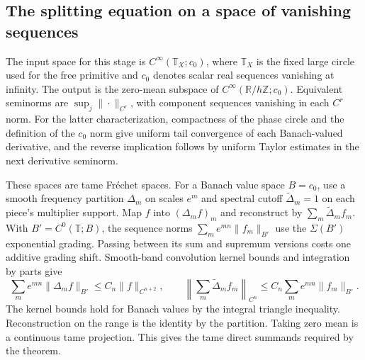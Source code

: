 \documentclass[11pt]{article}
\begin{document}
\subsection{The splitting equation on a space of vanishing
sequences}\label{the-splitting-equation-on-a-space-of-vanishing-sequences}

The input space for this stage is \(C^\infty(\mathbb T_X;c_0)\), where
\(\mathbb T_X\) is the fixed large circle used for the free primitive and
\(c_0\) denotes scalar real sequences vanishing at infinity. The output is the
zero-mean subspace of \(C^\infty(\mathbb R/h\mathbb Z;c_0)\). Equivalent
seminorms are \(\sup_j\|\cdot\|_{C^r}\), with component sequences vanishing in
each \(C^r\) norm. For the latter characterization, compactness of the phase
circle and the definition of the \(c_0\) norm give uniform tail convergence of
each Banach-valued derivative, and the reverse implication follows by uniform
Taylor estimates in the next derivative seminorm.

These spaces are tame Fréchet spaces. For a Banach value space \(B=c_0\), use a
smooth frequency partition \(\Delta_m\) on scales \(e^m\) and spectral cutoff
\(\widetilde\Delta_m=1\) on each piece's multiplier support. Map \(f\) into
\((\Delta_m f)_m\) and reconstruct by \(\sum_m\widetilde\Delta_m f_m\). With
\(B'=C^0(\mathbb T;B)\), the sequence norms \(\sum_m e^{mn}\|f_m\|_{B'}\) use
the \(\Sigma(B')\) exponential grading. Passing between its sum and supremum
versions costs one additive grading shift. Smooth-band convolution kernel bounds
and integration by parts give \[
 \sum_me^{mn}\|\Delta_m f\|_{B'}\le C_n\|f\|_{C^{n+2}},
 \qquad
 \left\|\sum_m\widetilde\Delta_m f_m\right\|_{C^n}
       \le C_n\sum_m e^{mn}\|f_m\|_{B'}.
\] The kernel bounds hold for Banach values by the integral triangle inequality.
Reconstruction on the range is the identity by the partition. Taking zero mean
is a continuous tame projection. This gives the tame direct summands required by
the theorem.
\end{document}
